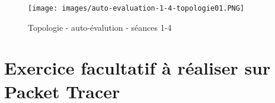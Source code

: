 \documentclass[a4paper]{article}
\begin{document}
\begin{figure}[H]
    \centering
    \texttt{[image: images/auto-evaluation-1-4-topologie01.PNG]}
    \caption{Topologie - auto-évalution - séances 1-4}
    \label{fig:auto-evaluation-1-4-topologie01}
\end{figure}















\newpage \section{Exercice facultatif à réaliser sur Packet Tracer}
\end{document}
